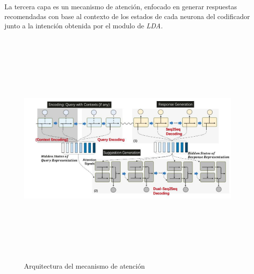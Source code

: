         La tercera capa es un mecanismo de atención, enfocado en generar respuestas recomendadas con base al contexto de los estados de cada neurona del codificador junto a la intención obtenida por el modulo de \it{LDA}. 
        \begin{figure}[H]
             \centering
             \includegraphics[height=12cm, width=16.5cm]{Latex/Classes/Imagenes/attention.jpeg}
             \caption{Arquitectura del mecanismo de atención}
              \label{fig:infraestructuraExtraccionNLP}
        \end{figure}
